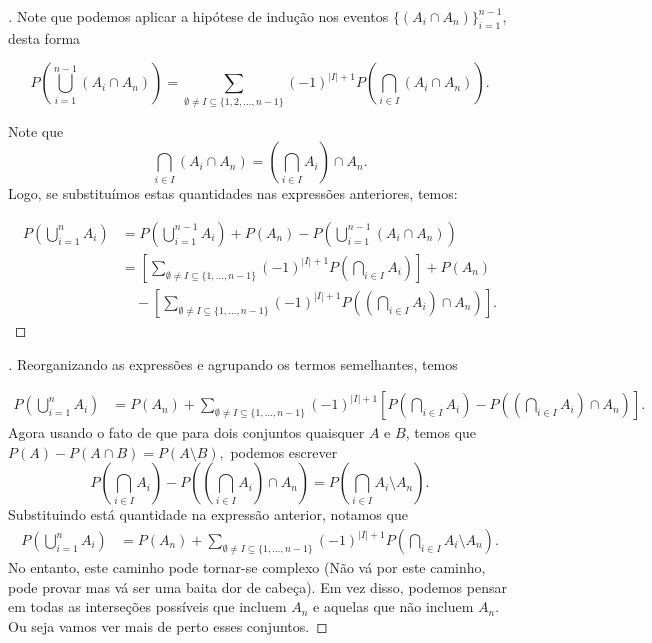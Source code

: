 \begin{frame}
\begin{proof}[]	
Note que podemos aplicar a hipótese de indução nos eventos \( \{ (A_i \cap A_n) \}_{i=1}^{n-1} \), desta forma

\[
P\left( \bigcup_{i=1}^{n-1} (A_i \cap A_n) \right) = \sum_{\emptyset \ne I \subseteq \{1,2,\ldots,n-1\}} (-1)^{|I|+1} P\left( \bigcap_{i \in I} (A_i \cap A_n) \right).
\]

Note que 
\[
\bigcap_{i \in I} (A_i \cap A_n) = \left( \bigcap_{i \in I} A_i \right) \cap A_n.
\]
Logo, se substituímos estas quantidades  nas expressões anteriores, temos:

\[
\begin{aligned}
	P\left( \bigcup_{i=1}^{n} A_i \right) &= P\left( \bigcup_{i=1}^{n-1} A_i \right) + P(A_n) - P\left( \bigcup_{i=1}^{n-1} (A_i \cap A_n) \right) \\
	&= \left[ \sum_{\emptyset \ne I \subseteq \{1,\ldots,n-1\}} (-1)^{|I|+1} P\left( \bigcap_{i \in I} A_i \right) \right] + P(A_n) \\
	&\quad - \left[ \sum_{\emptyset \ne I \subseteq \{1,\ldots,n-1\}} (-1)^{|I|+1} P\left( \left( \bigcap_{i \in I} A_i \right) \cap A_n \right) \right].
\end{aligned}
\]

\end{proof}

\end{frame}

\begin{frame}
	\begin{proof}[]	
 Reorganizando as expressões e  agrupando os termos semelhantes, temos

\[
\begin{aligned}
	P\left( \bigcup_{i=1}^{n} A_i \right) &= P(A_n) + \sum_{\emptyset \ne I \subseteq \{1,\ldots,n-1\}} (-1)^{|I|+1} \left[ P\left( \bigcap_{i \in I} A_i \right) - P\left( \left( \bigcap_{i \in I} A_i \right) \cap A_n \right) \right].
\end{aligned}
\]		
Agora usando o fato de que para dois conjuntos quaisquer $A$ e $B$, temos que $P(A) - P(A \cap B) = P(A \setminus B),$  podemos escrever
\[
P\left( \bigcap_{i \in I} A_i \right) - P\left( \left( \bigcap_{i \in I} A_i \right) \cap A_n \right) = P\left( \bigcap_{i \in I} A_i \setminus A_n \right).
\]
Substituindo está quantidade na expressão anterior, notamos que
\[
\begin{aligned}
	P\left( \bigcup_{i=1}^{n} A_i \right) &= P(A_n) + \sum_{\emptyset \ne I \subseteq \{1,\ldots,n-1\}} (-1)^{|I|+1} P\left( \bigcap_{i \in I} A_i \setminus A_n \right).
\end{aligned}
\]
No entanto, este caminho pode tornar-se complexo (Não vá por este caminho, pode provar mas vá ser uma baita dor de cabeça). Em vez disso, podemos pensar em todas as interseções possíveis que incluem \( A_n \) e aquelas que não incluem \( A_n \). Ou seja vamos ver mais de perto esses conjuntos. 
\end{proof}

\end{frame}


